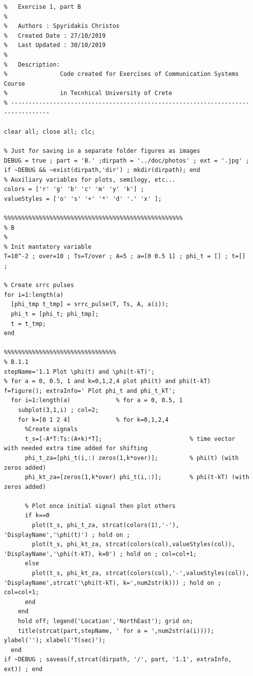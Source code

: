 \documentclass[11pt]{article}
\begin{document}
%
%
%
\begin{lstlisting}[caption = {\texttt{part\_b.m}}]
% ---------------------------------------------------------------------------------
%   Exercise 1, part B
%
%   Authors : Spyridakis Christos
%   Created Date : 27/10/2019
%   Last Updated : 30/10/2019
%
%   Description: 
%               Code created for Exercises of Communication Systems Course
%               in Tecnhical University of Crete
% ---------------------------------------------------------------------------------

clear all; close all; clc;

% Just for saving in a separate folder figures as images
DEBUG = true ; part = 'B.' ;dirpath = '../doc/photos' ; ext = '.jpg' ; if ~DEBUG && ~exist(dirpath,'dir') ; mkdir(dirpath); end
% Auxiliary variables for plots, semilogy, etc...
colors = ['r' 'g' 'b' 'c' 'm' 'y' 'k'] ;
valueStyles = ['o' 's' '+' '*' 'd' '.' 'x' ];

%%%%%%%%%%%%%%%%%%%%%%%%%%%%%%%%%%%%%%%%%%%%%%%%%%%
% B
%
% Init mantatory variable 
T=10^-2 ; over=10 ; Ts=T/over ; A=5 ; a=[0 0.5 1] ; phi_t = [] ; t=[] ; 

% Create srrc pulses 
for i=1:length(a)
  [phi_tmp t_tmp] = srrc_pulse(T, Ts, A, a(i));
  phi_t = [phi_t; phi_tmp];
  t = t_tmp;
end

%%%%%%%%%%%%%%%%%%%%%%%%%%%%%%%%
% B.1.1
stepName='1.1 Plot \phi(t) and \phi(t-kT)'; 
% for a = 0, 0.5, 1 and k=0,1,2,4 plot phi(t) and phi(t-kT)
f=figure(); extraInfo=' Plot phi_t and phi_t_kT';
  for i=1:length(a)             % for a = 0, 0.5, 1
    subplot(3,1,i) ; col=2;
    for k=[0 1 2 4]             % for k=0,1,2,4
      %Create signals
      t_s=[-A*T:Ts:(A+k)*T];                         % time vector with needed extra time added for shifting
      phi_t_za=[phi_t(i,:) zeros(1,k*over)];         % phi(t) (with zeros added)
      phi_kt_za=[zeros(1,k*over) phi_t(i,:)];        % phi(t-kT) (with zeros added)
      
      % Plot once initial signal then plot others
      if k==0 
        plot(t_s, phi_t_za, strcat(colors(1),'-'), 'DisplayName','\phi(t)') ; hold on ; 
        plot(t_s, phi_kt_za, strcat(colors(col),valueStyles(col)), 'DisplayName','\phi(t-kT), k=0') ; hold on ; col=col+1; 
      else
        plot(t_s, phi_kt_za, strcat(colors(col),'-',valueStyles(col)), 'DisplayName',strcat('\phi(t-kT), k=',num2str(k))) ; hold on ; col=col+1; 
      end
    end
    hold off; legend('Location','NorthEast'); grid on;
    title(strcat(part,stepName, ' for a = ',num2str(a(i)))); ylabel(''); xlabel('T(sec)'); 
  end
if ~DEBUG ; saveas(f,strcat(dirpath, '/', part, '1.1', extraInfo, ext)) ; end


\end{lstlisting}
\end{document}

